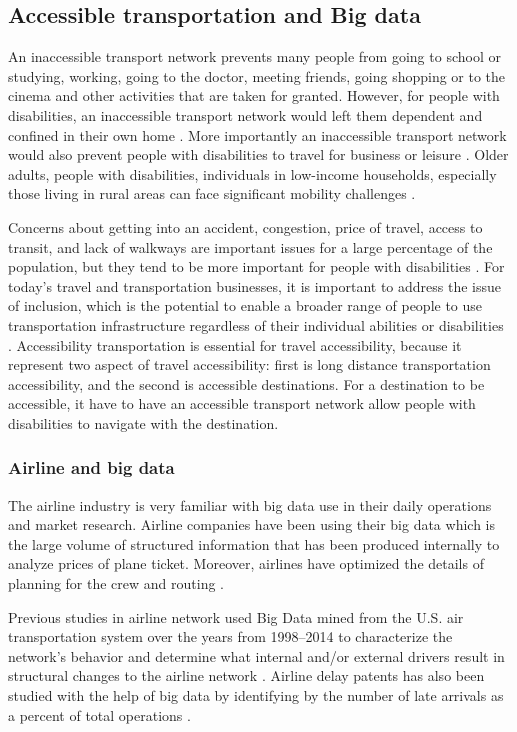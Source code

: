 \subsection{Accessible transportation and Big data}
An inaccessible transport network prevents many people from going to school 
or studying, working, going to the doctor, meeting friends, going shopping 
or to the cinema and other activities that are taken for granted. However,
for people with disabilities, an inaccessible transport
network would left them dependent and confined in their own home \cite{Ama}. 
More importantly an inaccessible transport network would also prevent people with disabilities to
travel for business or leisure \cite{milo}.
Older adults, people with disabilities, individuals in low-income households, especially 
those living in rural areas can face significant mobility challenges \cite{moya2016dynamic}. 

Concerns about getting into an accident, congestion,
price of travel, access to transit, and lack of walkways are important issues for a large
percentage of the population, but they tend to be more important for people with
disabilities \cite{moya2016dynamic}. For today's travel and transportation businesses,
it is important to address the issue of inclusion, which is the potential to enable 
a broader range of  people to use
transportation infrastructure regardless of their individual abilities or disabilities
\cite{milo}. Accessibility transportation is essential for travel accessibility, 
because it represent two aspect of travel accessibility: 
first is long distance transportation accessibility, and the second is accessible destinations. 
For a destination to be accessible, 
it have to have an accessible transport network allow people with disabilities 
to navigate with the destination.


\subsubsection{Airline and big data}
The airline industry is very familiar with big data use in their daily operations
and market research. Airline companies have been using their big data which is 
the large volume of structured information that has been produced internally 
\cite{MIAH2017} to analyze prices of plane ticket. Moreover, airlines 
have optimized the details of planning for the crew and routing \cite{Shafiee16}. 

Previous studies in airline network used Big Data mined from the U.S. air 
transportation system over the years from 1998–2014 to characterize the 
network's behavior and determine what internal and/or external drivers result 
in structural changes to the airline network \cite{7777957}. Airline delay 
patents has also been studied with the help of big data by identifying by the 
number of late arrivals as a percent of total operations \cite{Sor}. 

